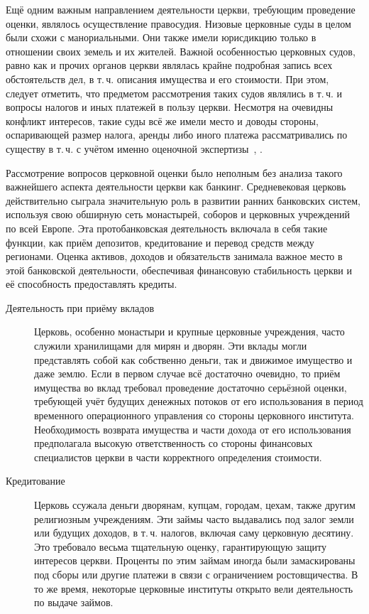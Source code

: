 \documentclass[12pt]{scrartcl}
\begin{document}
Ещё одним важным направлением деятельности церкви, требующим проведение оценки, являлось осуществление правосудия. Низовые церковные суды в целом были схожи с манориальными. Они также имели юрисдикцию только в отношении своих земель и их жителей. Важной особенностью церковных судов, равно как и прочих органов церкви являлась крайне подробная запись всех обстоятельств дел, в т.\,ч. описания имущества и его стоимости. При этом, следует отметить, что предметом рассмотрения таких судов являлись в т.\,ч. и вопросы налогов и иных платежей в пользу церкви. Несмотря на очевидны конфликт интересов, такие суды всё же имели место и доводы стороны, оспаривающей размер налога, аренды либо иного платежа рассматривались по существу в т.\,ч. с учётом именно оценочной экспертизы~\cite{Brundage1999}, \cite{Hartmann2008}.

Рассмотрение вопросов церковной оценки было неполным без анализа такого важнейшего аспекта деятельности церкви как банкинг. Средневековая церковь действительно сыграла значительную роль в развитии ранних банковских систем, используя свою обширную сеть монастырей, соборов и церковных учреждений по всей Европе. Эта протобанковская деятельность включала в себя такие функции, как приём депозитов, кредитование и перевод средств между регионами. Оценка активов, доходов и обязательств занимала важное место в этой банковской деятельности, обеспечивая финансовую стабильность церкви и её способность предоставлять кредиты.

\begin{description}
    \item[Деятельность при приёму вкладов] Церковь, особенно монастыри и крупные церковные учреждения, часто служили хранилищами для мирян и дворян. Эти вклады могли представлять собой как собственно деньги, так и движимое имущество и даже землю. Если в первом случае всё достаточно очевидно, то приём имущества во вклад требовал проведение достаточно серьёзной оценки, требующей учёт будущих денежных потоков от его использования в период временного операционного управления со стороны церковного института. Необходимость возврата имущества и части дохода от его использования предполагала высокую ответственность со стороны финансовых специалистов церкви в части корректного определения стоимости.
    \item[Кредитование] Церковь ссужала деньги дворянам, купцам, городам, цехам, также  другим религиозным учреждениям. Эти займы часто выдавались под залог  земли или будущих доходов, в т.\,ч. налогов, включая саму церковную десятину. Это требовало весьма тщательную оценку, гарантирующую защиту интересов церкви. Проценты по этим займам иногда были замаскированы под сборы или другие платежи в связи с ограничением ростовщичества. В то же время, некоторые церковные институты открыто вели деятельность по выдаче займов.
\end{description}
\end{document}
